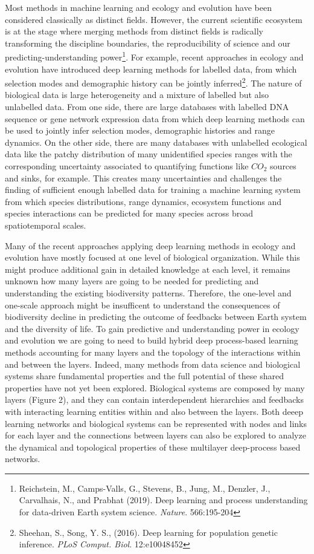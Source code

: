 \documentclass[authoryear,1p,12pt]{elsarticle}
\begin{document}
Most methods in machine learning and ecology and evolution have been
considered classically as distinct fields. However, the current
scientific ecosystem is at the stage where merging methods from
distinct fields is radically transforming the discipline boundaries,
the reproducibility of science and our predicting-understanding
power\footnote{Reichstein, M., Camps-Valls, G., Stevens, B., Jung, M.,
  Denzler, J., Carvalhais, N., and Prabhat (2019). Deep learning and
  process understanding for data-driven Earth system science.  {\em
    Nature}. 566:195-204}. For example, recent approaches in ecology
and evolution have introduced deep learning methods for labelled data,
from which selection modes and demographic history can be jointly
inferred\footnote{Sheehan, S., Song, Y. S., (2016). Deep learning for
  population genetic inference.  {\em PLoS
    Comput. Biol}. 12:e10048452}. The nature of biological data is
large heterogeneity and a mixture of labelled but also unlabelled
data. From one side, there are large databases with labelled DNA
sequence or gene network expression data from which deep learning
methods can be used to jointly infer selection modes, demographic
histories and range dynamics. On the other side, there are many
databases with unlabelled ecological data like the patchy distribution
of many unidentified species ranges with the corresponding uncertainty
associated to quantifying functions like $CO_2$ sources and sinks, for
example. This creates many uncertainties and challenges the finding of
sufficient enough labelled data for training a machine learning system
from which species distributions, range dynamics, ecosystem functions
and species interactions can be predicted for many species across
broad spatiotemporal scales.

Many of the recent approaches applying deep learning methods in
ecology and evolution have mostly focused at one level of biological
organization. While this might produce additional gain in detailed
knowledge at each level, it remains unknown how many layers are going
to be needed for predicting and understanding the existing
biodiversity patterns. Therefore, the one-level and one-scale approach
might be insufficent to understand the consequences of biodiversity
decline in predicting the outcome of feedbacks between Earth system
and the diversity of life. To gain predictive and understanding power
in ecology and evolution we are going to need to build hybrid deep
process-based learning methods accounting for many layers and the
topology of the interactions within and between the layers. Indeed,
many methods from data science and biological systems share
fundamental properties and the full potential of these shared
properties have not yet been explored. Biological systems are composed
by many layers (Figure 2), and they can contain interdependent
hierarchies and feedbacks with interacting learning entities within
and also between the layers. Both deeep learning networks and
biological systems can be represented with nodes and links for each
layer and the connections between layers can also be explored to
analyze the dynamical and topological properties of these multilayer
deep-process based networks.
\end{document}

